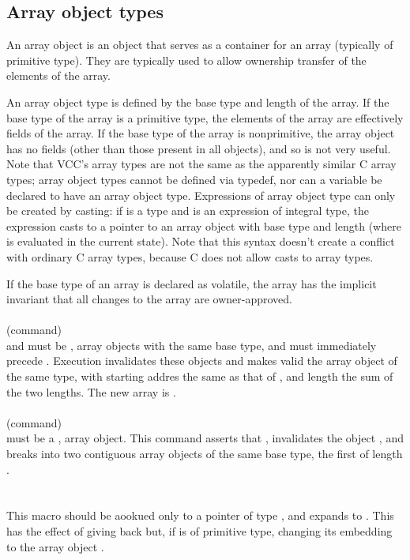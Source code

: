 \documentclass[preprint,nocopyrightspace]{sigplanconf}
\begin{document}
{{{\subsection{Array object types}
An array object is an object that serves as a container for an array
(typically of primitive type). They are typically used to allow
ownership transfer of the elements of the array.

An array  object type is  defined by the  base type and length  of the
array. If the base type of the array is a primitive type, the elements
of the array are effectively fields  of the array. If the base type of
the array is nonprimitive, the  array object has no fields (other than
those present  in all objects), and  so is not very  useful. Note that
VCC's array types  are not the same as the  apparently similar C array
types; array  object types  cannot be defined  via typedef, nor  can a
variable  be declared  to have  an array  object type.  Expressions of
array object type can only be created by casting: if  is a type
and       is    an   expression    of   integral    type,   the
expression    casts   to  a pointer  to an  array
object with  base type   and length   (where   is
evaluated in the current state).  Note that this syntax doesn't create
a conflict with ordinary C array types, because C does not allow casts
to array types.

If the base type of an array is declared as volatile, the array has
the implicit invariant that all changes to the array are
owner-approved.
\\\\
 (command)\\
 and  must be \vcc{\mutable}, \vcc{\writable} array objects with the same
base type, and  must immediately precede . Execution 
invalidates these objects and makes valid the array object of the same
type, with starting addres the same as that of , and length
the sum of the two lengths. The new array is \vcc{\mutable}.
\\\\
 (command)\\
 must be a \vcc{\mutable}, \vcc{\writable} array object. This
command asserts that , invalidates the
object , and breaks  into two \vcc{\mutable} contiguous array
objects of the same base type, the first of length .
\\\\
\\
This macro should be aookued only to a pointer  of type , and
expands to . This has the effect of giving
back  but, if  is of primitive type, changing its
embedding to the array object . 

}}}
\end{document}

